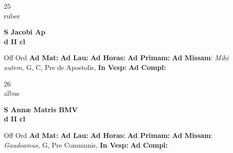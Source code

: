 \documentclass[10pt, openany]{book}
\begin{document}
    \begin{center}
        \begin{minipage}{3.5in}
            \vspace{2em}
            \begin{minipage}{0.5in}
                {\Huge 25} \\
                {\normalsize ruber}
            \end{minipage}
            \begin{minipage}{3.0in}
                \textbf{ \large S Jacobi Ap \\
                \textnormal{\normalsize d II cl}}

            \end{minipage}
            \begin{justify}Off Ord
                \textbf{Ad Mat: }
                \textbf{Ad Lau: }
                \textbf{Ad Horas: }
                \textbf{Ad Primam: }\textbf{Ad Missam}: \textit{Mihi autem,} G, C, Pre de Apostolis, 
                \textbf{In Vesp: }
                \textbf{Ad Compl: }
            \end{justify}
        \end{minipage}
    \end{center}

    \begin{center}
        \begin{minipage}{3.5in}
            \vspace{2em}
            \begin{minipage}{0.5in}
                {\Huge 26} \\
                {\normalsize albus}
            \end{minipage}
            \begin{minipage}{3.0in}
                \textbf{ \large S Annæ Matris BMV \\
                \textnormal{\normalsize d II cl}}

            \end{minipage}
            \begin{justify}Off Ord
                \textbf{Ad Mat: }
                \textbf{Ad Lau: }
                \textbf{Ad Horas: }
                \textbf{Ad Primam: }\textbf{Ad Missam}: \textit{Gaudeamus,} G, Pre Communis, 
                \textbf{In Vesp: }
                \textbf{Ad Compl: }
            \end{justify}
        \end{minipage}
    \end{center}
\end{document}
